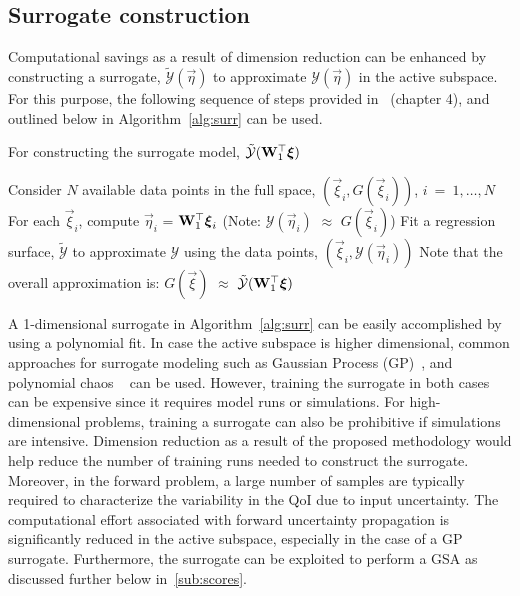 \subsection{Surrogate construction}
\label{sub:surr_sub}

Computational savings as a result of dimension reduction can be enhanced by
constructing a surrogate, $\tilde{\mathcal{Y}}(\vec{\eta})$ to approximate $\mathcal{Y}(\vec{\eta})$
in the active subspace. For this purpose, the following sequence of steps
provided in~\cite{Constantine:2015} (chapter 4), and outlined below in Algorithm~\ref{alg:surr}
can be used.
\bigskip
\begin{breakablealgorithm}
\renewcommand{\algorithmicrequire}{\textbf{Input:}}
\renewcommand{\algorithmicensure}{\textbf{Output:}}
  \caption{For constructing the surrogate model, $\tilde{\mathcal{Y}}(\mat{W}_1^\top\vec\xi)$}
  \begin{algorithmic}[1]
	  \State Consider $N$ available data points in the full space, $(\vec\xi_i,G(\vec\xi_i))$, $i~=~1,\ldots,N$
	  \State For each $\vec\xi_i$, compute $\vec\eta_i$ = $\mat{W}_1^\top\vec\xi_i$ 
          (Note: $\mathcal{Y}(\vec{\eta}_i)$ $\approx$ $G(\vec{\xi}_i)$)
	  \State Fit a regression surface, $\tilde{\mathcal{Y}}$ to approximate $\mathcal{Y}$ using the data
                 points, $(\vec\xi_i,\mathcal{Y}(\vec\eta_i))$
	  \State Note that the overall approximation is: $G(\vec{\xi})$ $\approx$
                 $\tilde{\mathcal{Y}}(\mat{W}_1^\top\vec{\xi})$ 
	\EndProcedure
  \end{algorithmic}
  \label{alg:surr}
\end{breakablealgorithm}
\bigskip

A 1-dimensional surrogate in Algorithm~\ref{alg:surr} can be easily accomplished by using a polynomial fit. 
In case the active subspace is higher dimensional, 
common approaches for surrogate modeling such as Gaussian Process 
(GP)~\cite{Rasmussen:2004}, and 
polynomial chaos ~\cite{Ghanem:1990, Xiu:2002} can be used. However, training the surrogate
in both cases can be expensive since it requires model runs or simulations. For high-dimensional
problems, training a surrogate can also be prohibitive if simulations are intensive. Dimension
reduction as a result of the proposed methodology would help reduce the number of training runs needed
to construct the surrogate. Moreover, in the forward problem, a large number of samples are typically
required to characterize the variability in the QoI due to input uncertainty. The computational
effort associated with forward uncertainty propagation is significantly reduced in the active subspace,
especially in the case of a GP surrogate. Furthermore, the surrogate can be exploited to perform a GSA
as discussed further below in~\ref{sub:scores}. 

